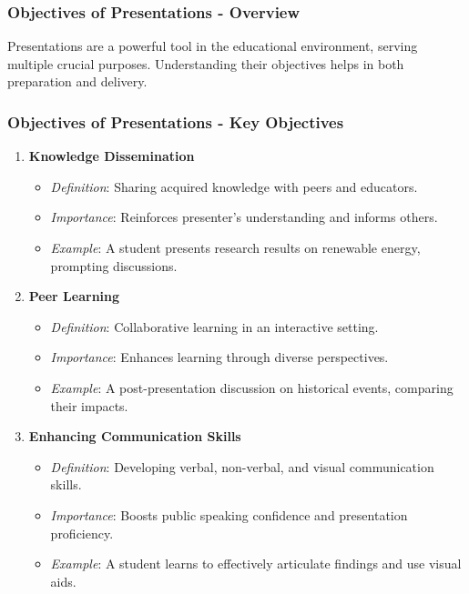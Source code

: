 \documentclass[aspectratio=169]{beamer}
\begin{document}
\begin{frame}[fragile]
    \frametitle{Objectives of Presentations - Overview}
    Presentations are a powerful tool in the educational environment, serving multiple crucial purposes. Understanding their objectives helps in both preparation and delivery.
\end{frame}

\begin{frame}[fragile]
    \frametitle{Objectives of Presentations - Key Objectives}
    \begin{enumerate}
        \item \textbf{Knowledge Dissemination}
        \begin{itemize}
            \item \textit{Definition}: Sharing acquired knowledge with peers and educators.
            \item \textit{Importance}: Reinforces presenter’s understanding and informs others.
            \item \textit{Example}: A student presents research results on renewable energy, prompting discussions.
        \end{itemize}
        
        \item \textbf{Peer Learning}
        \begin{itemize}
            \item \textit{Definition}: Collaborative learning in an interactive setting.
            \item \textit{Importance}: Enhances learning through diverse perspectives.
            \item \textit{Example}: A post-presentation discussion on historical events, comparing their impacts.
        \end{itemize}

        \item \textbf{Enhancing Communication Skills}
        \begin{itemize}
            \item \textit{Definition}: Developing verbal, non-verbal, and visual communication skills.
            \item \textit{Importance}: Boosts public speaking confidence and presentation proficiency.
            \item \textit{Example}: A student learns to effectively articulate findings and use visual aids.
        \end{itemize}
    \end{enumerate}
\end{frame}
\end{document}
